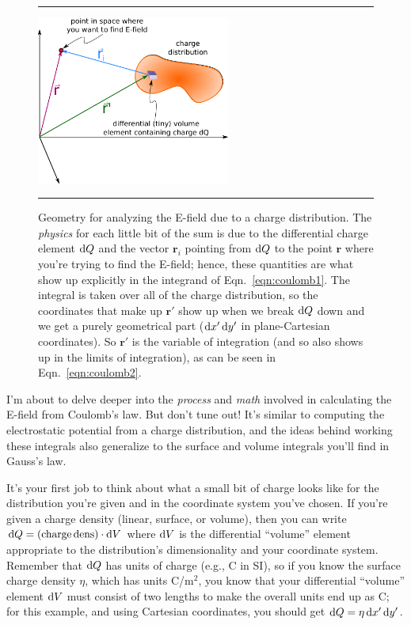 \documentclass[10pt,letterpaper,twoside]{article}
\begin{document}
\begin{figure}[htb]
  \centering
  \vspace{5pt}
  \hrule%
  \vspace{10pt}
	\centering
	\includegraphics[keepaspectratio=true,width=2.50in]{./coordinate_system.pdf}
    \caption{{Geometry for analyzing the E-field due to a charge distribution.
	The \textit{physics} for each little bit of the sum is due to the differential charge element $\text d Q$ and the vector $\bm r_i$ pointing from $\text d Q$ to the point $\bm r$ where you're trying to find the E-field; hence, these quantities are what show up {explicitly} in the integrand of Eqn.~\ref{eqn:coulomb1}.
	The integral is taken over all of the charge distribution, so the coordinates that make up $\bm r'$ show up when we break $\text d Q$ down and we get a purely geometrical part ($\text d x'\,\text d y'$ in plane-Cartesian coordinates).
	So $\bm r'$ is the variable of integration (and so also shows up in the limits of integration), as can be seen in Eqn.~\ref{eqn:coulomb2}.}}
    \label{fig:coord_coulomb_distr}
  \hrule%
\vspace{10pt}
\end{figure}

I'm about to delve deeper into the \textit{process} and \textit{math} involved in calculating the E-field from Coulomb's law.
But don't tune out!
It's similar to computing the electrostatic potential from a charge distribution, and the ideas behind working these integrals also generalize to the surface and volume integrals you'll find in Gauss's law.

It's your first job to think about what a small bit of charge looks like for the distribution you're given and in the coordinate system you've chosen.
If you're given a charge density (linear, surface, or volume), then you can write $\text d Q = (\text{charge\,dens}) \cdot \text d V$ where $\text d V$ is the differential ``volume'' element appropriate to the distribution's dimensionality and your coordinate system.
Remember that $\text d Q$ has units of charge (e.g., C in SI), so if you know the surface charge density $\eta$, which has units C/m$^2$, you know that your differential ``volume'' element $\text d V$ must consist of two lengths to make the overall units end up as C; for this example, and using Cartesian coordinates, you should get $\text d Q = \eta \, \text d x'\,\text d y'$.
\end{document}
